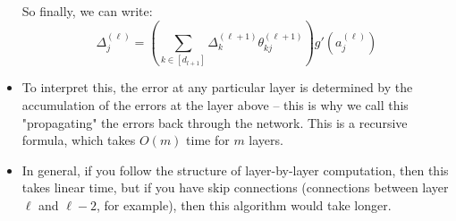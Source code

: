 \begin{itemize}
		So finally, we can write:
		\[
			\Delta_j^{(\ell)} = \left(\sum_{k \in [d_{l + 1}]} \Delta_k^{(\ell +
			1)}\theta_{kj}^{(\ell + 1)}\right)g'(a_j^{(\ell)})
		\]
	\item To interpret this, the error at any particular layer is determined by the
		accumulation of the errors at the layer above -- this is why we call this
		"propagating" the errors back through the network. This is a recursive
		formula, which takes \( O(m) \) time for \( m \) layers.
	\item In general, if you follow the structure of layer-by-layer computation, then
		this takes linear time, but if you have skip connections (connections between
		layer \( \ell \) and \( \ell - 2 \), for example), then this algorithm would
		take longer. 
\end{itemize}
